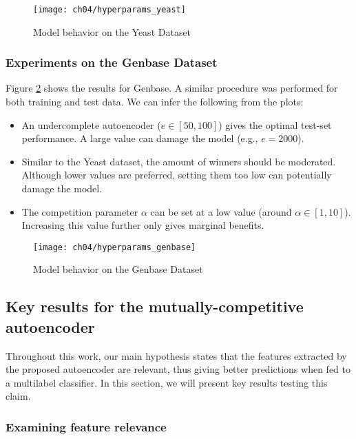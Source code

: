 \begin{figure}[!h]
  \centering
  \texttt{[image: ch04/hyperparams\_yeast]}
  \caption{Model behavior on the Yeast Dataset}
  \label{results:mc_char_yeast}
\end{figure}

\subsubsection{Experiments on the Genbase Dataset}

Figure \ref{results:mc_char_genbase} shows the results for Genbase. A similar
procedure was performed for both training and test data. We can infer the
following from the plots:

\begin{itemize}
  \item An undercomplete autoencoder ($e\in\left[50,100\right]$) gives the optimal test-set performance. A large value can damage the model (e.g., $e=2000$).
  \item Similar to the Yeast dataset, the amount of winners should be moderated. Although lower values are preferred, setting them too low can potentially damage the model.
  \item The competition parameter $\alpha$ can be set at a low value (around $\alpha \in \left[1,10\right]$). Increasing this value further only gives marginal benefits.
\end{itemize}

\begin{figure}[!h]
  \centering
  \texttt{[image: ch04/hyperparams\_genbase]}
  \caption{Model behavior on the Genbase Dataset}
  \label{results:mc_char_genbase}
\end{figure}


\subsection{Key results for the mutually-competitive autoencoder}

Throughout this work, our main hypothesis states that the features extracted by
the proposed autoencoder are relevant, thus giving better predictions when
fed to a multilabel classifier. In this section, we will present key results
testing this claim.

\subsubsection{Examining feature relevance}

